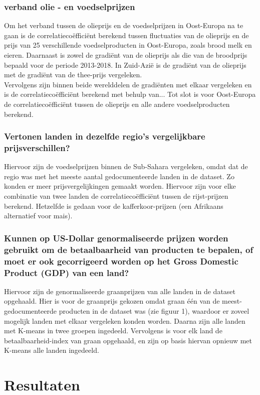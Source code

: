 \documentclass{article}
\begin{document}
\subsubsection*{verband olie - en voedselprijzen}
Om het verband tussen de olieprijs en de voedselprijzen in Oost-Europa na te gaan is de correlatiecoëfficiënt berekend tussen fluctuaties van de olieprijs en de prijs van 25 verschillende voedselproducten in Oost-Europa, zoals brood melk en eieren.
Daarnaast is zowel de gradiënt van de olieprijs als die van de broodprijs bepaald voor de periode 2013-2018.
In Zuid-Azië is de gradiënt van de olieprijs met de gradiënt van de thee-prijs vergeleken.\\
Vervolgens zijn binnen beide werelddelen de gradiënten met elkaar vergeleken en is de correlatiecoëfficiënt berekend met behulp van...
Tot slot is voor Oost-Europa de correlatiecoëfficiënt tussen de olieprijs en alle andere voedselproducten berekend.


\subsubsection*{Vertonen landen in dezelfde regio’s vergelijkbare prijsverschillen?}
Hiervoor zijn de voedselprijzen binnen de Sub-Sahara vergeleken, omdat dat de regio was met het meeste aantal gedocumenteerde landen in de dataset. Zo konden er meer prijsvergelijkingen gemaakt worden.
Hiervoor zijn voor elke combinatie van twee landen de correlatiecoëfficiënt tussen de rijst-prijzen berekend. Hetzelfde is gedaan voor de kafferkoor-prijzen (een Afrikaans alternatief voor mais). 


\subsubsection*{Kunnen op US-Dollar genormaliseerde prijzen worden gebruikt om de betaalbaarheid van producten te bepalen, of moet er ook gecorrigeerd worden op het Gross Domestic Product (GDP) van een land?}
Hiervoor zijn de genormaliseerde graanprijzen van alle landen in de dataset opgehaald. Hier is voor de graanprijs gekozen omdat graan één van de meest-gedocumenteerde producten in de dataset was (zie figuur 1), waardoor er zoveel mogelijk landen met elkaar vergeleken konden worden. Daarna zijn alle landen met K-means in twee groepen ingedeeld.
Vervolgens is voor elk land de betaalbaarheid-index van graan opgehaald, en zijn op basis hiervan opnieuw met K-means alle landen ingedeeld.

\newpage
\section*{Resultaten}
\end{document}
